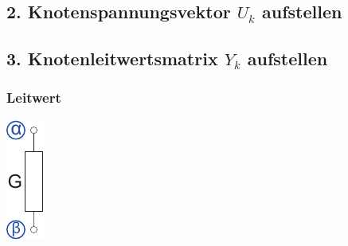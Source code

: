 \documentclass[a4paper,twocolumn,10pt]{article}
\begin{document}
\subsection*{2. Knotenspannungsvektor $U_k$ aufstellen}
\subsection*{3. Knotenleitwertsmatrix $Y_k$ aufstellen}
\subsubsection*{Leitwert}
\begin{minipage}[b]{0.05\textwidth}
\includegraphics[width=\textwidth]{img/KSA_Widerstand}
\end{minipage}
\end{document}
